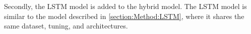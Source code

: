 Secondly, the LSTM model is added to the hybrid model.
The LSTM model is similar to the model described in \cref{section:Method:LSTM},
where it shares the same dataset, tuning, and architectures.













